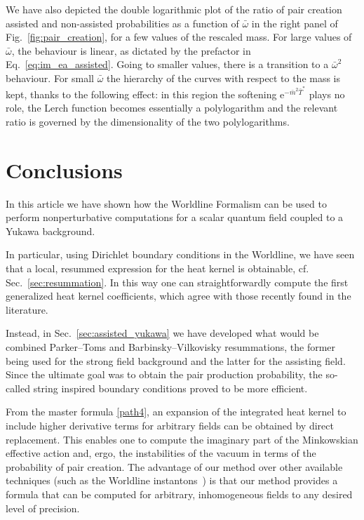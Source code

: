 \documentclass[12pt,a4paper]{article}
\numberwithin{equation}{section}
\numberwithin{equation}{section}
\begin{document}
We have also depicted the double logarithmic plot of the ratio of pair creation assisted and non-assisted probabilities as a function of $\bar\omega$ in the right panel of Fig.~\ref{fig:pair_creation}, for a few values of the rescaled mass. For large values of $\bar\omega$, the behaviour is linear, as dictated by the prefactor in Eq.~\eqref{eq:im_ea_assisted}. Going to smaller values, there is a transition to a $\bar\omega^2$ behaviour. For small $\bar\omega$ the hierarchy of the curves with respect to the mass is kept, thanks to the following effect: in this region the softening ${\mathrm{e}}^{-\bar m ^2 \bar T^*}$ plays no role, the Lerch function becomes essentially a polylogarithm and the relevant ratio is governed by the dimensionality of the two polylogarithms.


\section{Conclusions}\label{sec:conclusion}
In this article we have shown how the Worldline Formalism can be used to perform nonperturbative computations for a scalar quantum field coupled to a Yukawa background.

In particular, using Dirichlet boundary conditions in the Worldline, we have seen that a local, resummed expression for the heat kernel is obtainable, cf. Sec.~\ref{sec:resummation}. In this way one can straightforwardly compute the first generalized heat kernel coefficients, which agree with those recently found in the literature.

Instead, in Sec.~\ref{sec:assisted_yukawa} we have developed what would be combined Parker--Toms and Barbinsky--Vilkovisky resummations, the former being used for the strong field background and the latter for the assisting field. Since the ultimate goal was to obtain the pair production probability, the so-called string inspired boundary conditions proved to be more efficient. 

From the master formula \eqref{path4}, an expansion of the integrated heat kernel to include higher derivative terms for arbitrary fields can be obtained by direct replacement. 
This enables one to compute the imaginary part of the Minkowskian effective action and, ergo, the instabilities of the vacuum in terms of the probability of pair creation. The advantage of our method over other available techniques (such as the Worldline instantons~\cite{Dunne:2006st}) is that our method provides a formula that can be computed for arbitrary, inhomogeneous fields to any desired level of precision.
\end{document}
